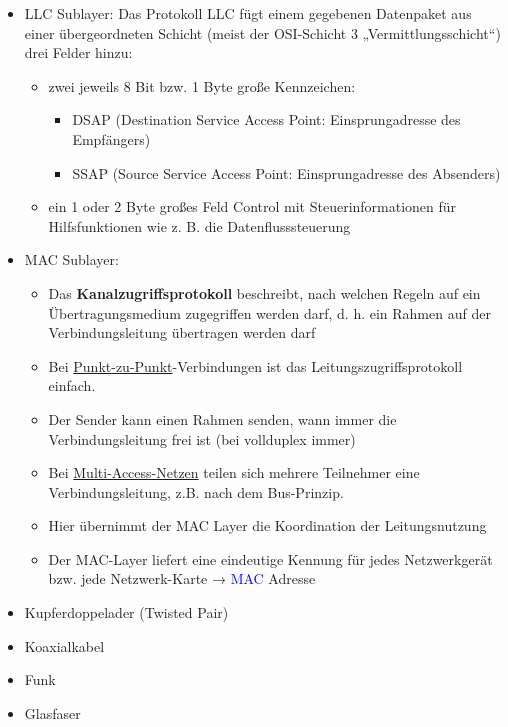 
\begin{itemize}
    \item LLC Sublayer: Das Protokoll LLC fügt einem gegebenen Datenpaket aus einer übergeordneten Schicht (meist der OSI-Schicht 3 „Vermittlungsschicht“) drei Felder hinzu:
    \begin{itemize}
        \item zwei jeweils 8 Bit bzw. 1 Byte große Kennzeichen:
        \begin{itemize}
            \item DSAP (Destination Service Access Point: Einsprungadresse des Empfängers)
            \item SSAP (Source Service Access Point: Einsprungadresse des Absenders)
        \end{itemize}
        \item ein 1 oder 2 Byte großes Feld Control mit Steuerinformationen für Hilfsfunktionen wie z. B. die Datenflusssteuerung
    \end{itemize}
    \item MAC Sublayer:
    \begin{itemize}
        \item Das \textbf{Kanalzugriffsprotokoll} beschreibt, nach welchen Regeln auf ein Übertragungsmedium zugegriffen werden darf, d. h. ein Rahmen auf der Verbindungsleitung übertragen werden darf
        \item Bei \underline{Punkt-zu-Punkt}-Verbindungen ist das Leitungszugriffsprotokoll einfach.
        \item Der Sender kann einen Rahmen senden, wann immer die Verbindungsleitung frei ist (bei vollduplex immer)
        \item Bei \underline{Multi-Access-Netzen} teilen sich mehrere Teilnehmer eine Verbindungsleitung, z.B. nach dem Bus-Prinzip.
        \item Hier übernimmt der MAC Layer die Koordination der Leitungsnutzung
        \item Der MAC-Layer liefert eine eindeutige Kennung für jedes Netzwerkgerät bzw. jede Netzwerk-Karte → \textcolor{blue}{MAC} Adresse
    \end{itemize}
\end{itemize}

\begin{itemize}
    \item Kupferdoppelader (Twisted Pair)
    \item Koaxialkabel
    \item Funk
    \item Glasfaser
\end{itemize}

